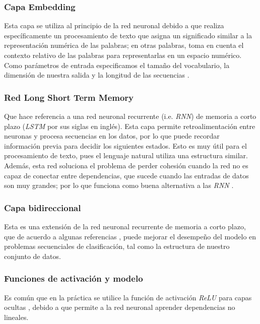 \documentclass[sigconf, nonacm, spanish]{acmart}
\begin{document}
\subsubsection{Capa Embedding} 

Esta capa se utiliza al principio de la red neuronal debido a que realiza específicamente un procesamiento de texto que asigna un significado similar a la representación numérica de las palabras; en otras palabras, toma en cuenta el contexto relativo de las palabras para representarlas en un espacio numérico. Como parámetros de entrada especificamos el tamaño del vocabulario, la dimensión de nuestra salida y la longitud de las secuencias \cite{notas_clase, embedding, embedding2}.


\subsubsection{Red Long Short Term Memory}

Que hace referencia a una red neuronal recurrente (i.e. \textit{RNN}) de memoria a corto plazo (\textit{LSTM} por sus siglas en inglés). Esta capa permite retroalimentación entre neuronas y procesa secuencias en los datos, por lo que puede recordar información previa para decidir los siguientes estados. Esto es muy útil para el procesamiento de texto, pues el lenguaje natural utiliza una estructura similar. Además, esta red soluciona el problema de perder cohesión cuando la red no es capaz de conectar entre dependencias, que sucede cuando las entradas de datos son muy grandes; por lo que funciona como buena alternativa a las \textit{RNN} \cite{notas_clase, lstm, lstm_use}.

\subsubsection{Capa bidireccional}

Esta es una extensión de la red neuronal recurrente de memoria a corto plazo, que de acuerdo a algunas referencias \cite{notas_clase, bidireccional, bidi2}, puede mejorar el desempeño del modelo en problemas secuenciales de clasificación, tal como la estructura de nuestro conjunto de datos. 

\subsubsection{Funciones de activación y modelo}

Es común que en la práctica se utilice la función de activación \textit{ReLU} para capas ocultas \cite{notas_clase}, debido a que permite a la red neuronal aprender dependencias no lineales. 
\end{document}
